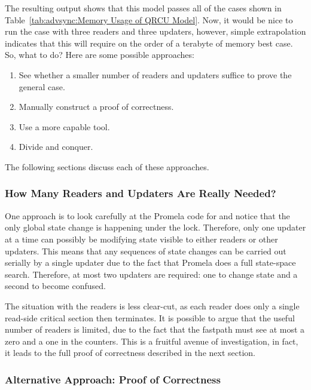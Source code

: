 The resulting output shows that this model passes all of the cases
shown in
Table~\ref{tab:advsync:Memory Usage of QRCU Model}.
Now, it would be nice to run the case with three readers and three
updaters, however, simple extrapolation indicates that this will
require on the order of a terabyte of memory best case.
So, what to do?
Here are some possible approaches:

\begin{enumerate}
\item	See whether a smaller number of readers and updaters suffice
	to prove the general case.
\item	Manually construct a proof of correctness.
\item	Use a more capable tool.
\item	Divide and conquer.
\end{enumerate}

The following sections discuss each of these approaches.

\subsubsection{How Many Readers and Updaters Are Really Needed?}
\label{sec:formal:How Many Readers and Updaters Are Really Needed?}

One approach is to look carefully at the Promela code for
 and notice that the only global state
change is happening under the lock.
Therefore, only one updater at a time can possibly be modifying
state visible to either readers or other updaters.
This means that any sequences of state changes can be carried
out serially by a single updater due to the fact that Promela does a full
state-space search.
Therefore, at most two updaters are required: one to change state
and a second to become confused.

The situation with the readers is less clear-cut, as each reader
does only a single read-side critical section then terminates.
It is possible to argue that the useful number of readers is limited,
due to the fact that the fastpath must see at most a zero and a one
in the counters.
This is a fruitful avenue of investigation, in fact, it leads to
the full proof of correctness described in the next section.

\subsubsection{Alternative Approach: Proof of Correctness}
\label{sec:formal:Alternative Approach: Proof of Correctness}

